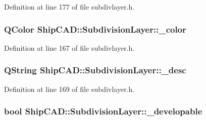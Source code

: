 Definition at line 177 of file subdivlayer.\+h.

\subsubsection[{\texorpdfstring{\+\_\+color}{_color}}]{\setlength{\rightskip}{0pt plus 5cm}Q\+Color Ship\+C\+A\+D\+::\+Subdivision\+Layer\+::\+\_\+color\hspace{0.3cm}{\ttfamily [protected]}}\hypertarget{classShipCAD_1_1SubdivisionLayer_a6da22248952737662360fa3b2730a35f}{}\label{classShipCAD_1_1SubdivisionLayer_a6da22248952737662360fa3b2730a35f}


Definition at line 167 of file subdivlayer.\+h.

\subsubsection[{\texorpdfstring{\+\_\+desc}{_desc}}]{\setlength{\rightskip}{0pt plus 5cm}Q\+String Ship\+C\+A\+D\+::\+Subdivision\+Layer\+::\+\_\+desc\hspace{0.3cm}{\ttfamily [protected]}}\hypertarget{classShipCAD_1_1SubdivisionLayer_a33bbfedf8f0d130d91c74a65a575eb2a}{}\label{classShipCAD_1_1SubdivisionLayer_a33bbfedf8f0d130d91c74a65a575eb2a}


Definition at line 169 of file subdivlayer.\+h.

\subsubsection[{\texorpdfstring{\+\_\+developable}{_developable}}]{\setlength{\rightskip}{0pt plus 5cm}bool Ship\+C\+A\+D\+::\+Subdivision\+Layer\+::\+\_\+developable\hspace{0.3cm}{\ttfamily [protected]}}\hypertarget{classShipCAD_1_1SubdivisionLayer_a81dad738f58f9b4632c1575d0b59ddb0}{}\label{classShipCAD_1_1SubdivisionLayer_a81dad738f58f9b4632c1575d0b59ddb0}


